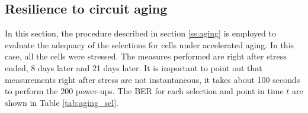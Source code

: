 





\subsection{Resilience to circuit aging}

In this section, the procedure described in section \ref{ss:aging} is employed to evaluate the adequacy of the selections for cells under accelerated aging. In this case, all the cells were stressed. The measures performed are right after stress ended, 8 days later and 21 days later. It is important to point out that measurements right after stress are not instantaneous, it takes about 100 seconds to perform the 200 power-ups. The BER for each selection and point in time $t$ are shown in Table \ref{tab:aging_sel}.

